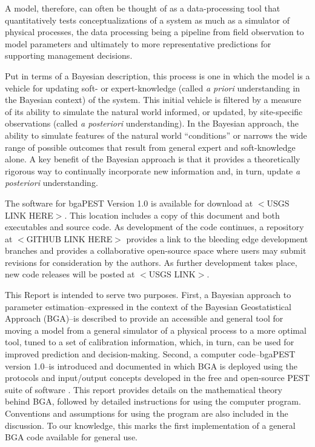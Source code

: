 \documentclass[11pt,oneside,onecolumn]{usgsreport}
\begin{document}
\begin{multicols}{2}
A model, therefore, can often be thought of as a data-processing tool
that quantitatively tests conceptualizations of a system as much as
a simulator of physical processes, the data processing being a pipeline
from field observation to model parameters and ultimately to more
representative predictions for supporting management decisions. 

Put in terms of a Bayesian description, this process is one in which
the model is a vehicle for updating soft- or expert-knowledge (called
\emph{a priori} understanding in the Bayesian context) of the system.
This initial vehicle is filtered by a measure of its ability to simulate
the natural world informed, or updated, by site-specific observations
(called \emph{a posteriori} understanding). In the Bayesian approach,
the ability to simulate features of the natural world ``conditions''
or narrows the wide range of possible outcomes that result from general
expert and soft-knowledge alone. A key benefit of the Bayesian approach
is that it provides a theoretically rigorous way to continually incorporate
new information and, in turn, update \emph{a posteriori} understanding.




The software for bgaPEST Version 1.0 is available for download at
$<$USGS LINK HERE$>$. This location includes a copy of this document and
both executables and source code. As development of the code continues,
a repository at $<$GITHUB LINK HERE$>$ provides a link to the bleeding
edge development branches and provides a collaborative open-source
space where users may submit revisions for consideration by the authors.
As further development takes place, new code releases will be posted
at $<$USGS LINK$>$. 



This Report is intended to serve two purposes. First, a Bayesian approach
to parameter estimation--expressed in the context of the Bayesian
Geostatistical Approach (BGA)--is described to provide an accessible
and general tool for moving a model from a general simulator of a
physical process to a more optimal tool, tuned to a set of calibration
information, which, in turn, can be used for improved prediction and
decision-making. Second, a computer code--bgaPEST version 1.0--is
introduced and documented in which BGA is deployed using the protocols
and input/output concepts developed in the free and open-source PEST
suite of software \citet{PEST}. This report provides details on the
mathematical theory behind BGA, followed by detailed instructions
for using the computer program. Conventions and assumptions for using
the program are also included in the discussion. To our knowledge,
this marks the first implementation of a general BGA code available
for general use. 


\end{multicols}
\end{document}
